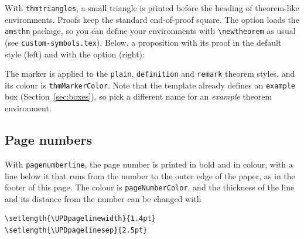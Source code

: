 With \texttt{thmtriangles}, a small triangle is printed before the heading of theorem-like environments. Proofs keep the standard end-of-proof square.
The option loads the \texttt{amsthm} package, so you can define your environments with \verb|\newtheorem| as usual (see \texttt{custom-symbols.tex}).
Below, a proposition with its proof in the default style (left) and with the option (right):

\begin{center}
\end{center}

The marker is applied to the \texttt{plain}, \texttt{definition} and \texttt{remark} theorem styles, and its colour is \texttt{thmMarkerColor}.
Note that the template already defines an \texttt{example} box (Section~\ref{sec:boxes}), so pick a different name for an \emph{example} theorem environment.

\subsection{Page numbers}

With \texttt{pagenumberline}, the page number is printed in bold and in colour, with a line below it that runs from the number to the outer edge of the paper, as in the footer of this page.
The colour is \texttt{pageNumberColor}, and the thickness of the line and its distance from the number can be changed with
\begin{lstlisting}[language={[latex]TeX}]
\setlength{\UPDpagelinewidth}{1.4pt}
\setlength{\UPDpagelinesep}{2.5pt}
\end{lstlisting}

